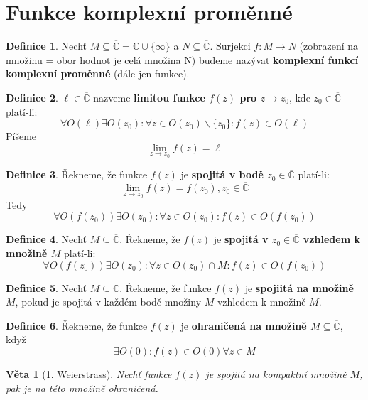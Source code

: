 \documentclass[a4]{report}
\newtheorem{theorem}{Věta}
\theoremstyle{definition}
\newtheorem{definition}{Definice}[section]
\begin{document}
\section{Funkce komplexní proměnné}

\begin{definition}
Nechť $M\subseteq \overline{\mathbb{C}}=\mathbb{C}\cup \{\infty\}$ a $N\subseteq \mathbb{\overline{C}}$. Surjekci $f:M\rightarrow N$    (zobrazení na množinu = obor hodnot je celá množina N) budeme nazývat \textbf{komplexní funkcí komplexní proměnné} (dále jen funkce).
\end{definition}

\begin{definition}
$\ell\in\mathbb{\overline{C}}$ nazveme \textbf{limitou funkce $f(z)$ pro $z\rightarrow z_0$}, kde $z_0\in\mathbb{\overline{C}}$ platí-li: $$\forall O(\ell) \exists O(z_0): \forall z\in O(z_0)\backslash\{z_0\}: f(z)\in O(\ell)$$
Píšeme $$\lim_{z\to z_0}f(z)=\ell$$
\end{definition}

\begin{definition}
Řekneme, že funkce $f(z)$ je \textbf{spojitá v bodě $z_0\in\mathbb{\overline{C}}$} platí-li:
$$\lim_{z\to z_0}f(z)=f(z_0), z_0\in\mathbb{\overline{C}}$$
Tedy $$\forall O(f(z_0)) \exists O(z_0): \forall z\in O(z_0): f(z)\in O(f(z_0))$$
\end{definition}

\begin{definition}
Nechť $M\subseteq \overline{\mathbb{C}}$. Řekneme, že $f(z)$ je \textbf{spojitá v $z_0\in\overline{\mathbb{C}}$ vzhledem k množině $M$} platí-li: $$\forall O(f(z_0)) \exists O(z_0): \forall z\in O(z_0)\cap M: f(z)\in O(f(z_0))$$ 
\end{definition}

\begin{definition}
Nechť $M\subseteq \overline{\mathbb{C}}$. Řekneme, že funkce $f(z)$ je \textbf{spojiitá na množině $M$}, pokud je spojitá v každém bodě množiny $M$ vzhledem k množině $M$.
\end{definition}

\begin{definition}
Řekneme, že funkce $f(z)$ je \textbf{ohraničená na množině $M\subseteq \overline{\mathbb{C}}$}, když
$$\exists O(0): f(z)\in O(0) \forall z\in M$$
\end{definition}

\begin{theorem}[1. Weierstrass]
Nechť funkce $f(z)$ je spojitá na kompaktní množině $M$, pak je na této množině ohraničená.
\end{theorem}
\end{document}
